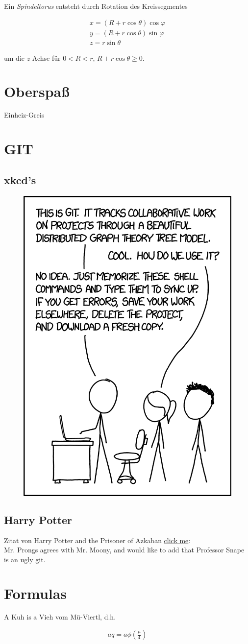 \documentclass{article}
\begin{document}
Ein \textit{Spindeltorus} entsteht durch Rotation des Kreissegmentes

\begin{align*}
  x = (R + r \cos{\theta}) \cos{\varphi} \\
  y = (R + r \cos{\theta}) \sin{\varphi} \\
  z = r \sin{\theta}
\end{align*}

um die $z$-Achse für $0 < R < r$, $R + r \cos{\theta} \geq 0$.

\section{Oberspaß}
\glqq Einheiz-Greis\grqq

\section{GIT}

\subsection{xkcd's}

\begin{figure}[h!]
  \centering
  \includegraphics[width = 0.5 \linewidth]{images/git_2x.png}
\end{figure}

\subsection{Harry Potter}

Zitat von \glqq Harry Potter and the Prisoner of Azkaban\grqq
\href{https://www.hp-lexicon.org/quote/professor-snape-ugly-git/}{click me}: \\

\glqq Mr. Prongs agrees with Mr. Moony, and would like to add that Professor Snape is an ugly git.\grqq

\section{Formulas}

\glqq A Kuh is a Vieh vom Mü-Viertl\grqq, d.h.

\begin{align}
  aq = a \phi \left( \frac{\mu}{4} \right)
\end{align}
\end{document}
